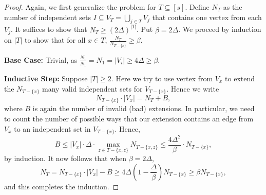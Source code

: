 \documentclass[a4paper]{article}
\begin{document}
\begin{proof}
  Again, we first generalize the problem for $T \subseteq [s]$. Define $N_T$ as the number of
  independent sets $I \subseteq V_T = \bigcup_{j \in T} V_j$ that contains one vertex from each
  $V_j$. It suffices to show that $N_T \geq (2\Delta)^{|T|}$. Put $\beta = 2\Delta$. We proceed by
  induction on $|T|$ to show that for all $x \in T$, $\frac{N_T}{N_{T - \{x\}}} \geq \beta$. 

  \textbf{Base Case:} Trivial, as $\frac{N_1}{N_1} = N_1 = |V_i| \geq 4\Delta \geq \beta$.

  \textbf{Inductive Step:} Suppose $|T| \geq 2$. Here we try to use vertex from $V_x$ to extend the
  $N_{T - \{x\}}$ many valid independent sets for $V_{T - \{x\}}$. Hence we write
  \[
    N_{T - \{x\}} \cdot |V_x| = N_T + B,
  \]
  where $B$ is again the number of invalid (bad) extensions. In particular, we need to count the
  number of possible ways that our extension contains an edge from $V_x$ to an independent set in
  $V_{T - \{x\}}$. Hence,
  \[
    B \leq |V_x| \cdot \Delta \cdot \max_{z \in T - \{x, z\}} N_{T - \{x, z\}} \leq \frac{4\Delta^2}{\beta} \cdot N_{T - \{x\}},
  \]
  by induction. It now follows that when $\beta = 2\Delta$,
  \[
    N_T = N_{T - \{x\}} \cdot |V_x| - B \geq 4\Delta \left(1 - \frac{\Delta}{\beta}\right)N_{T - \{x\}} \geq \beta N_{T - \{x\}},
  \]
  and this completes the induction.
\end{proof}
\end{document}
